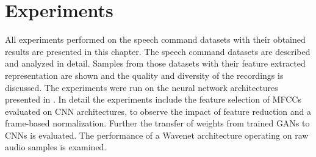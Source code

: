 
\chapter{Experiments}\label{sec:exp}
All experiments performed on the speech command datasets with their obtained results are presented in this chapter.
The speech command datasets are described and analyzed in detail.
Samples from those datasets with their feature extracted representation are shown and the quality and diversity of the recordings is discussed.
The experiments were run on the neural network architectures presented in .
In detail the experiments include the feature selection of MFCCs evaluated on CNN architectures, to observe the impact of feature reduction and a frame-based normalization.
Further the transfer of weights from trained GANs to CNNs is evaluated.
The performance of a Wavenet architecture operating on raw audio samples is examined.








